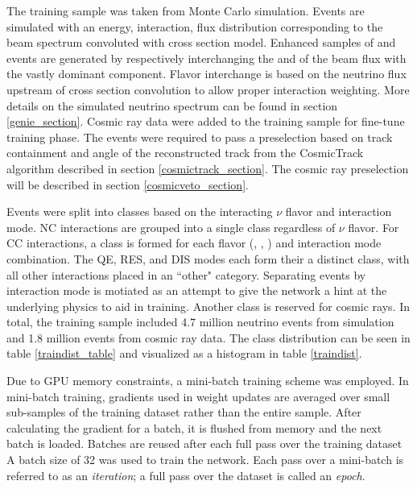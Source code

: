 The training sample was taken from \nova Monte Carlo simulation.
Events are simulated with an energy, interaction, flux distribution
corresponding to the \numi beam spectrum convoluted with \genie
cross section model.  Enhanced samples of \nue and \nutau
events are generated by respectively interchanging the \nue and \nutau
of the \numi beam flux with the vastly dominant \numu component.
Flavor interchange is based on the neutrino flux
upstream of \genie cross section convolution to allow proper interaction
weighting.
More details on the simulated neutrino spectrum can be found in section
\ref{genie_section}.
Cosmic ray data were added to the training sample for fine-tune training phase.
The events were required to pass a preselection based on track
containment and angle of the reconstructed track from the CosmicTrack algorithm
described in section \ref{cosmictrack_section}.
The cosmic ray preselection will be described in section
\ref{cosmicveto_section}.



Events were split into classes based on the interacting $\nu$ flavor and
\genie interaction mode.
NC interactions are grouped into a single class regardless of $\nu$ flavor.
For CC interactions, a class is formed for each flavor (\nue, \numu, \nutau)
and \genie interaction mode combination.
The QE, RES, and DIS modes each form their a distinct class, with
all other interactions placed in an ``other" category.
Separating events by interaction mode is motiated as an attempt to give
the network a hint at the underlying physics to aid in training.
Another class is reserved for cosmic rays.
In total, the training sample included 4.7 million neutrino events from \nova
simulation and 1.8 million events from cosmic ray data.
The class distribution can be seen in table \ref{traindist_table} and
visualized as a histogram in table \ref{traindist}.




Due to GPU memory constraints, a mini-batch training scheme was employed.
In mini-batch training, gradients used in weight updates are averaged over
small sub-samples of the training dataset rather than the entire sample.
After calculating the gradient for a batch, it is flushed from memory
and the next batch is loaded.
Batches are reused after each full pass over the training dataset
A batch size of 32 was used to train the network.
Each pass over a mini-batch is referred to as an \textit{iteration};
a full pass over the dataset is called an \textit{epoch}.


